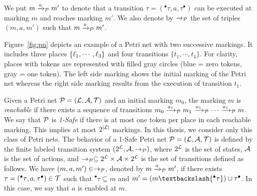 We put $m\xrightarrow{a}_{\mathcal{P}}m'$ to denote that a transition $\tau=({^\bullet\tau},a,
  \tau^\bullet)$ can be executed at marking $m$ and reaches marking $m'$. 
  We also denote by $\xrightarrow{}_{\mathcal{P}}$
the set of triples $(m,a,m')$ such that $m\xrightarrow{a}_{\mathcal{P}}m'$.
  
\begin{example}
  Figure~\ref{fig:pn} depicts an example of a Petri net with two successive markings. It includes
  three places $\{\ell_1,\cdots,\ell_3\}$ and four transitions $\{t_1,\cdots,t_4\}$. For clarity,
  places with tokens are represented with filled gray circles (blue = zero tokens, 
  gray = one token). The left side marking 
  shows the initial marking of the Petri net whereas the right side marking results from the
  execution of transition $t_1$.
\end{example}

Given a Petri net $\mathcal{P}=(\mathcal{L},\mathcal{A},\mathcal{T})$ and an initial marking $m_0$, the marking $m$
is \emph{reachable} if there exists a sequence of transitions $m_0\xrightarrow{a_1}_{\mathcal{P}}m_1
\xrightarrow{a_1}_{\mathcal{P}}\cdots\xrightarrow{a_1}_{\mathcal{P}}m$. We say that $\mathcal{P}$ is \emph{1-Safe}
if there is at most one token per place in each reachable marking. This implies at most
$2^{|\mathcal{L}|}$ markings. In this thesis, we consider only this class of Petri nets.
The behavior of a 1-Safe Petri net  $\mathcal{P}=(\mathcal{L},\mathcal{A},\mathcal{T})$ is defined by the finite
labeled transition system $(2^{\mathcal{L}},\mathcal{A},\to_{\mathcal{P}})$, where $2^{\mathcal{L}}$ is the set of
states, $\mathcal{A}$ is the set of actions, and $\to_{\mathcal{P}}\subseteq 2^{\mathcal{L}}\times\mathcal{A}\times
2^{\mathcal{L}}$ is the set of transitions defined as follows. We have $(m,a,m')\in\to_{\mathcal{P}}$, 
denoted by $m\xrightarrow{a}_{\mathcal{P}}m'$, if there exists $\tau=({^\bullet\tau},a,{\tau^\bullet })
  \in\mathcal{T}$ such that ${^\bullet\tau}\subseteq m$ and $m'=(m\textbackslash{^\bullet\tau})
  \cup{\tau^\bullet }$.
In this case, we say that $a$ is enabled at $m$.

